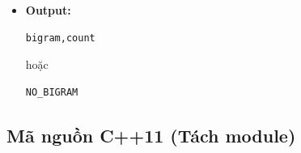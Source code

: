 \begin{itemize}
\begin{itemize}
\begin{itemize}
            \item Chỉ in 20 bigram đầu
        \end{itemize}

        \item \textbf{Module 7 (Ghi output):}

        \begin{itemize}
            \item File:
\begin{lstlisting}
bigram.csv
\end{lstlisting}

            \item Format:
\begin{lstlisting}
bigram,count
\end{lstlisting}
        \end{itemize}

    \end{itemize}

    \item \textbf{Output:}

\begin{lstlisting}
bigram,count
\end{lstlisting}

hoặc

\begin{lstlisting}
NO_BIGRAM
\end{lstlisting}

\end{itemize}

\subsection{Mã nguồn C++11 (Tách module)}

